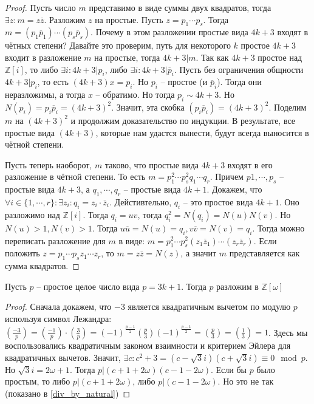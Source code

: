 \documentclass{article}
\begin{document}
\begin{proof}
    Пусть число $m$ представимо в виде суммы двух квадратов, тогда $\exists z: m = z \overline z$. Разложим $z$ на
    простые. Пусть $z = p_1 \cdots p_s$. Тогда $m = (p_1 \overline p_1) \cdots (p_s \overline p_s)$. Почему в этом
    разложении простые вида $4k+3$ входят в чётных степени? Давайте это проверим, путь для некоторого $k$ простое $4k+3$
    входит в разложение $m$ на простые,
    тогда $4k+3|m$. Так как $4k+3$ простое над $\mathbb{Z}[i]$, то либо $\exists i: 4k+3|p_i$, либо $\exists i: 4k+3|\overline p_i$.
    Пусть без
    ограничения общности $4k+3|p_i$, то есть $(4k+3)x = p_i$. Но $p_i$ -- простое (и $\overline p_i$). Тогда они
    неразложимы, а тогда $x$ -- обратимо. Но тогда $p_i \sim 4k+3$. Но $N(p_i) = p_i \overline p_i = (4k+3)^2$. Значит,
    эта скобка $(p_i \overline p_i) = (4k+3)^2$. Поделим $m$ на $(4k+3)^2$ и продолжим доказательство по индукции. В
    результате, все простые вида $(4k+3)$, которые нам удастся вынести, будут всегда выносится в чётной степени.

    Пусть теперь наоборот, $m$ таково, что простые вида $4k+3$ входят в его разложение в чётной степени. То есть $m =
    p_1^2 \cdots p_s^2 q_1 \cdots q_r$. Причем $p1, \cdots, p_s$ -- простые вида $4k+3$, а $q_1, \cdots, q_r$ -- простые
    вида $4k+1$. Докажем, что $\forall i \in \{1, \cdots, r\}: \exists z_i: q_i = z_i \cdot \overline z_i$.
    Дейстивтельно, $q_i$ -- это простое вида $4k+1$. Оно разложимо над $\mathbb{Z}[i]$. Тогда $q_i = uv$, тогда $q_i^2 =
    N(q_i) = N(u)N(v)$. Но $N(u) > 1, N(v) > 1$. Тогда $u \overline u = N(u) = q_i, v \overline v = N(v) = q_i$. Тогда
    можно переписать разложение для $m$ в виде: $m = p_1^2 \cdots p_s^2 (z_1 \overline z_1) \cdots (z_r \overline z_r)$.
    Если положить $z = p_1 \cdots p_s z_1 \cdots z_r$, то $m = z \overline z = N(z)$, а значит $m$ представляется как сумма
    квадратов.
\end{proof}

\begin{statement}
    Пусть $p$ -- простое целое число вида $p = 3k+1$. Тогда $p$ разложим в $\mathbb{Z}[\omega]$
\end{statement}

\begin{proof}
    Сначала докажем, что $-3$ является квадратичным вычетом по модулю $p$ используя символ Лежандра:
    $\left(\frac{-3}{p}\right) = \left(\frac{-1}{p}\right) \cdot \left( \frac{3}{p} \right) =
    (-1)^{\frac{p - 1}{2}} \left( \frac{p}{3} \right) (-1)^{\frac{p - 1}{2}} = \left( \frac{p}{3} \right) = \left(
    \frac{1}{3} \right) = 1$. Здесь мы воспользовались квадратичным законом взаимности и критерием Эйлера для
    квадратичных вычетов. Значит, $\exists c: c^2 + 3 = (c - \sqrt{3}i)(c + \sqrt{3}i) \equiv 0 \mod p$. Но
    $\sqrt{3}i = 2 \omega + 1$. Тогда $p | (c + 1 + 2 \omega)(c - 1 - 2\omega)$. Если бы $p$ было простым, то либо $p|(c
    + 1 + 2\omega)$, либо $p|(c - 1 - 2\omega)$. Но это не так (показано в \ref{div_by_natural})
\end{proof}
\end{document}
